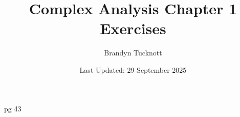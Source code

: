 \documentclass{exam}
\title{Complex Analysis Chapter 1 Exercises}
\author{Brandyn Tucknott}
\date{Last Updated: 29 September 2025}
\begin{document}
\maketitle

pg 43
\end{document}

